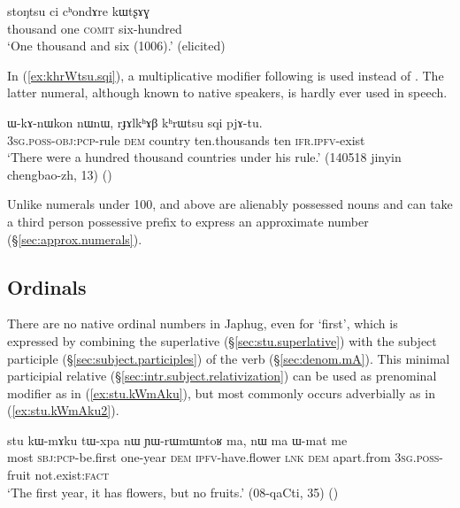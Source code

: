 \begin{exe}
\ex  \label{ex:stoNtsu.1006}
\gll  stoŋtsu ci cʰondɤre kɯtʂɤɣ \\
 thousand one \textsc{comit} six-hundred \\
\glt `One thousand and six (1006).' (elicited)
\end{exe}

In (\ref{ex:khrWtsu.sqi}), a multiplicative modifier  following  is used instead of . The latter numeral, although known to native speakers, is hardly ever used in speech.

\begin{exe}
\ex  \label{ex:khrWtsu.sqi}
\gll ɯ-kɤ-nɯkon nɯnɯ, rɟɤlkʰɤβ kʰrɯtsu sqi pjɤ-tu. \\
 \textsc{3sg}.\textsc{poss}-\textsc{obj}:\textsc{pcp}-rule \textsc{dem} country ten.thousands ten \textsc{ifr}.\textsc{ipfv}-exist \\
\glt `There were a hundred thousand countries under his rule.' (140518 jinyin chengbao-zh, 13) ()
\end{exe} 


 
Unlike numerals under 100,  and above are alienably possessed nouns and can take a third person possessive prefix  to express an approximate number (§\ref{sec:approx.numerals}).

 \subsection{Ordinals} \label{sec:ordinals}
There are no native ordinal numbers in Japhug, even for `first', which is expressed by combining the superlative  (§\ref{sec:stu.superlative}) with the subject participle (§\ref{sec:subject.participles}) of the verb  (§\ref{sec:denom.mA}). This minimal participial relative  (§\ref{sec:intr.subject.relativization}) can be used as prenominal modifier as in (\ref{ex:stu.kWmAku}), but most commonly occurs adverbially as in (\ref{ex:stu.kWmAku2}).   
 
\begin{exe}
\ex  \label{ex:stu.kWmAku}
\gll stu kɯ-mɤku tɯ-xpa nɯ ɲɯ-rɯmɯntoʁ ma, nɯ ma ɯ-mat me \\
most \textsc{sbj}:\textsc{pcp}-be.first one-year \textsc{dem} \textsc{ipfv}-have.flower \textsc{lnk} \textsc{dem} apart.from \textsc{3sg}.\textsc{poss}-fruit not.exist:\textsc{fact} \\
\glt `The first year, it has flowers, but no fruits.' (08-qaCti, 35)
()
\end{exe}
  
